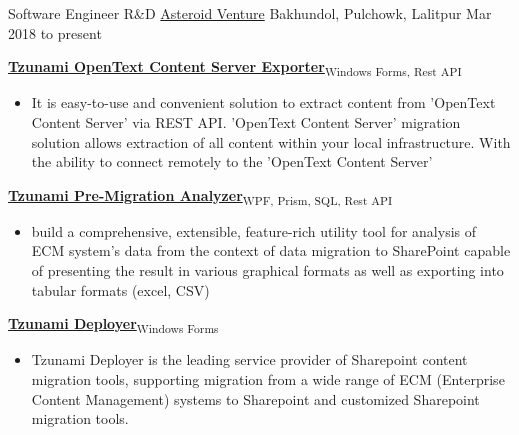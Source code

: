 

\begin{cventries}
\cventry
{Software Engineer R\&D} %
{\href{https://asteroidventure.com/}{Asteroid Venture}} %
{Bakhundol, Pulchowk, Lalitpur} %
{Mar 2018 to present} %
{
\begin{cvitems} %
		\item {\textbf{\href{https://tzunami.com/opentext-content-server/}{Tzunami OpenText Content Server Exporter}}\textsubscript{Windows Forms, Rest API}}
		\begin{itemize}
			\item {It is easy-to-use and convenient solution to extract content from 'OpenText Content Server' via REST API. 'OpenText Content Server' migration solution allows extraction of all content within your local infrastructure. With the ability to connect remotely to the 'OpenText Content Server'}
		\end{itemize}
		\item {\textbf{\href{https://tzunami.com/pre-migration-analysis/}{Tzunami Pre-Migration Analyzer}}\textsubscript{WPF, Prism, SQL, Rest API}}
		\begin{itemize}
			\item {build a comprehensive, extensible, feature-rich utility tool for analysis of ECM system's data from the context of data migration to SharePoint capable of presenting the result in various graphical formats as well as exporting into tabular formats (excel, CSV)}
		\end{itemize}
		\item {\textbf{\href{https://tzunami.com/}{Tzunami Deployer}}\textsubscript{Windows Forms}}
		\begin{itemize}
			\item {Tzunami Deployer is the leading service provider of Sharepoint content migration tools, supporting migration from a wide range of ECM (Enterprise Content Management) systems to Sharepoint and customized Sharepoint migration tools.}
		\end{itemize}

\end{cvitems}}
\end{cventries}
